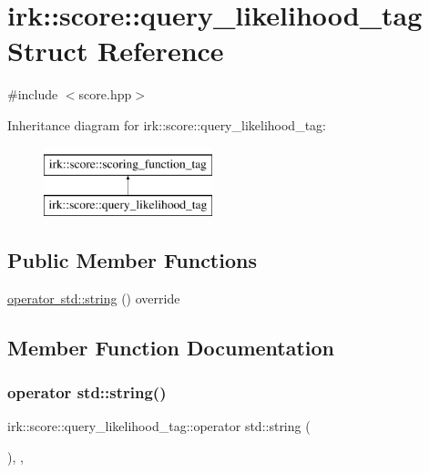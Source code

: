 \hypertarget{structirk_1_1score_1_1query__likelihood__tag}{}\section{irk\+:\+:score\+:\+:query\+\_\+likelihood\+\_\+tag Struct Reference}
\label{structirk_1_1score_1_1query__likelihood__tag}


{\ttfamily \#include $<$score.\+hpp$>$}

Inheritance diagram for irk\+:\+:score\+:\+:query\+\_\+likelihood\+\_\+tag\+:\begin{figure}[H]
\begin{center}
\leavevmode
\includegraphics[height=2.000000cm]{structirk_1_1score_1_1query__likelihood__tag}
\end{center}
\end{figure}
\subsection*{Public Member Functions}
\begin{DoxyCompactItemize}
\item 
\mbox{\hyperlink{structirk_1_1score_1_1query__likelihood__tag_af0559f12be12863cf0fe6a6df56829f8}{operator std\+::string}} () override
\end{DoxyCompactItemize}


\subsection{Member Function Documentation}
\mbox{\label{structirk_1_1score_1_1query__likelihood__tag_af0559f12be12863cf0fe6a6df56829f8}} 
\subsubsection{\texorpdfstring{operator std\+::string()}{operator std::string()}}
{\footnotesize\ttfamily irk\+::score\+::query\+\_\+likelihood\+\_\+tag\+::operator std\+::string (\begin{DoxyParamCaption}{ }\end{DoxyParamCaption})\hspace{0.3cm}{\ttfamily [inline]}, {\ttfamily [override]}, {\ttfamily [virtual]}}



